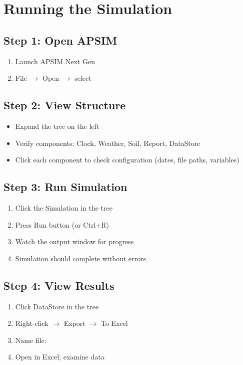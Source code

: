 \section{Running the Simulation}

\subsection{Step 1: Open APSIM}

\begin{enumerate}
  \item Launch APSIM Next Gen
  \item File $\to$ Open $\to$ select 
\end{enumerate}

\subsection{Step 2: View Structure}

\begin{itemize}
  \item Expand the tree on the left
  \item Verify components: Clock, Weather, Soil, Report, DataStore
  \item Click each component to check configuration (dates, file paths, variables)
\end{itemize}

\subsection{Step 3: Run Simulation}

\begin{enumerate}
  \item Click the Simulation in the tree
  \item Press Run button (or Ctrl+R)
  \item Watch the output window for progress
  \item Simulation should complete without errors
\end{enumerate}

\subsection{Step 4: View Results}

\begin{enumerate}
  \item Click DataStore in the tree
  \item Right-click $\to$ Export $\to$ To Excel
  \item Name file: 
  \item Open in Excel; examine data
\end{enumerate}

